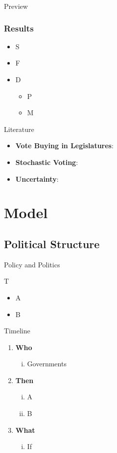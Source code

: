 \documentclass[handout]{beamer}
\begin{document}
\begin{frame}{Preview}
\frametitle{Results}

\pause
\begin{itemize}[<+->]
	\item S
	\item F
	\item D
		\begin{itemize}
			\item P
			\item M
		\end{itemize}
\end{itemize}
\end{frame}

 
\begin{frame}{Literature}
\pause
\begin{itemize}[<+->]
	\item \textbf{Vote Buying in Legislatures}: 
	\item \textbf{Stochastic Voting}: 
	\item \textbf{Uncertainty}: 
\end{itemize}
\end{frame} 





\section{Model}
\subsection{Political Structure}
\begin{frame}{Policy and Politics}

\pause
T
\pause
\begin{itemize}
	\item A
	\pause
	\item B
\end{itemize}


\end{frame}



\begin{frame}{Timeline}
\pause
\begin{enumerate}[<+->]
	\item {\bfseries Who}
		\begin{enumerate}[i.]
			\item Governments 
		\end{enumerate}
	\item \textbf{Then}
		\begin{enumerate}[i.]
			\item A
			\item B
		\end{enumerate}
	\item \textbf{What}
		\begin{enumerate}[i.]
			\item If
		\end{enumerate}
\end{enumerate}
\end{frame}
\end{document}
